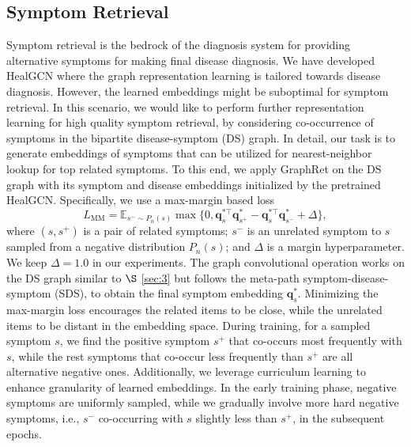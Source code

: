 \documentclass[sigconf]{acmart}
\newcommand{\q}{\bm{q}}
\begin{document}
\subsection{Symptom Retrieval}
Symptom retrieval is the bedrock of the diagnosis system for providing alternative symptoms for making final disease diagnosis. We have developed HealGCN where the graph representation learning is tailored towards disease diagnosis. However, the learned embeddings might be suboptimal for symptom retrieval. In this scenario, we would like to perform further representation learning for high quality symptom retrieval, by considering co-occurrence of symptoms in the bipartite disease-symptom (DS) graph. In detail, our task is to generate embeddings of symptoms that can be utilized for nearest-neighbor lookup for top related symptoms. To this end, we apply GraphRet on the DS graph with its symptom and disease embeddings initialized by the pretrained HealGCN. Specifically, we use a max-margin based loss \cite{ying2018graph}
\begin{equation}
L_{\text{MM}} = \mathbb{E}_{s^- \sim P_n(s)}\max \{0, \q_s^{* \top} \q^*_{s^+} - \q_s^{* \top} \q^*_{s^-} + \Delta \},
\end{equation}
where $(s,s^+)$ is a pair of related symptoms; $s^-$ is an unrelated symptom to $s$ sampled from a negative distribution $P_n(s)$; and $\Delta$ is a margin hyperparameter. We keep $\Delta=1.0$ in our experiments. The graph convolutional operation works on the DS graph similar to $\S$ \ref{sec:3} but follows the meta-path symptom-disease-symptom (SDS), to obtain the final symptom embedding $\q_s^*$. Minimizing the max-margin loss encourages the related items to be close, while the unrelated items to be distant in the embedding space. During training, for a sampled symptom $s$, we find the positive symptom $s^+$ that co-occurs most frequently with $s$, while the rest symptoms that co-occur less frequently than $s^+$ are all alternative negative ones. Additionally, we leverage curriculum learning \cite{bengio2009curriculum} to enhance granularity of learned embeddings. In the early training phase, negative symptoms are uniformly sampled, while we gradually involve more hard negative symptoms, i.e., $s^-$ co-occurring with $s$ slightly less than $s^+$, in the subsequent epochs.
\end{document}
